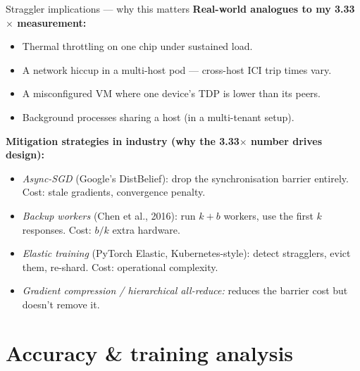 \documentclass[aspectratio=169,10pt]{beamer}
\begin{document}
\begin{frame}{Straggler implications — why this matters}
  \textbf{Real-world analogues to my 3.33$\times$ measurement:}
  \begin{itemize}
    \item Thermal throttling on one chip under sustained load.
    \item A network hiccup in a multi-host pod — cross-host ICI trip times vary.
    \item A misconfigured VM where one device's TDP is lower than its peers.
    \item Background processes sharing a host (in a multi-tenant setup).
  \end{itemize}

  \vspace{0.4em}
  \textbf{Mitigation strategies in industry (why the 3.33$\times$ number drives design):}
  \begin{itemize}
    \item \emph{Async-SGD} (Google's DistBelief): drop the synchronisation barrier entirely.
          Cost: stale gradients, convergence penalty.
    \item \emph{Backup workers} (Chen et al., 2016): run $k+b$ workers, use the first $k$
          responses. Cost: $b/k$ extra hardware.
    \item \emph{Elastic training} (PyTorch Elastic, Kubernetes-style): detect stragglers,
          evict them, re-shard. Cost: operational complexity.
    \item \emph{Gradient compression / hierarchical all-reduce:} reduces the barrier cost
          but doesn't remove it.
  \end{itemize}
\end{frame}

\section{Accuracy \& training analysis}
\end{document}
